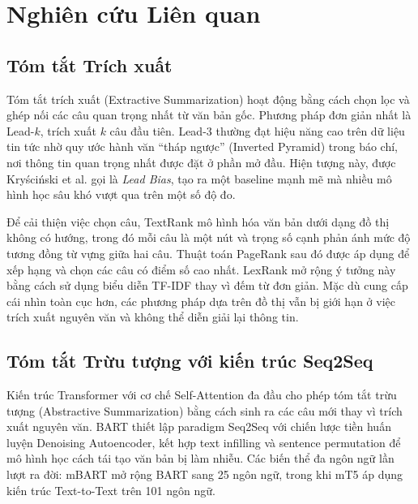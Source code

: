 \documentclass{article}
\begin{document}
\section{Nghiên cứu Liên quan}
\label{sec:related_work}

\subsection{Tóm tắt Trích xuất}

Tóm tắt trích xuất (Extractive Summarization) hoạt động bằng cách chọn lọc và ghép nối các câu quan trọng nhất từ văn bản gốc. Phương pháp đơn giản nhất là Lead-$k$, trích xuất $k$ câu đầu tiên. Lead-3 thường đạt hiệu năng cao trên dữ liệu tin tức nhờ quy ước hành văn ``tháp ngược'' (Inverted Pyramid) trong báo chí, nơi thông tin quan trọng nhất được đặt ở phần mở đầu. Hiện tượng này, được Kryściński et al. \cite{lead_bias} gọi là \textit{Lead Bias}, tạo ra một baseline mạnh mẽ mà nhiều mô hình học sâu khó vượt qua trên một số độ đo.

Để cải thiện việc chọn câu, TextRank \cite{textrank} mô hình hóa văn bản dưới dạng đồ thị không có hướng, trong đó mỗi câu là một nút và trọng số cạnh phản ánh mức độ tương đồng từ vựng giữa hai câu. Thuật toán PageRank \cite{pagerank} sau đó được áp dụng để xếp hạng và chọn các câu có điểm số cao nhất. LexRank \cite{lexrank} mở rộng ý tưởng này bằng cách sử dụng biểu diễn TF-IDF thay vì đếm từ đơn giản. Mặc dù cung cấp cái nhìn toàn cục hơn, các phương pháp dựa trên đồ thị vẫn bị giới hạn ở việc trích xuất nguyên văn và không thể diễn giải lại thông tin.

\subsection{Tóm tắt Trừu tượng với kiến trúc Seq2Seq}

Kiến trúc Transformer \cite{vaswani2017} với cơ chế Self-Attention đa đầu cho phép tóm tắt trừu tượng (Abstractive Summarization) bằng cách sinh ra các câu mới thay vì trích xuất nguyên văn. BART \cite{bart_original} thiết lập paradigm Seq2Seq với chiến lược tiền huấn luyện Denoising Autoencoder, kết hợp text infilling và sentence permutation để mô hình học cách tái tạo văn bản bị làm nhiễu. Các biến thể đa ngôn ngữ lần lượt ra đời: mBART \cite{mbart} mở rộng BART sang 25 ngôn ngữ, trong khi mT5 \cite{mt5} áp dụng kiến trúc Text-to-Text trên 101 ngôn ngữ.
\end{document}

